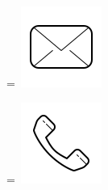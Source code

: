 \documentclass[]{latex/resume}
\begin{document}
\begin{minipage}[t]{0.25\textwidth}
    \begingroup
        =\hbox{
            \includegraphics[scale=0.1,trim={0 1cm 0cm 0cm}]{latex/icons/mail.png} 
        }
        \parbox{\wd0}{}
    \endgroup
    \begingroup
        =\hbox{ \includegraphics[scale=0.1,trim={0 1.25cm -0.4cm 0cm}]{latex/icons/phone.png}\hspace{0.2cm} }
        \parbox{\wd0}{}
    \endgroup \\




\end{minipage}
\end{document}
